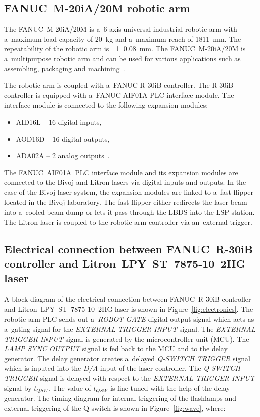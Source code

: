 \subsection{FANUC~M-20iA/20M robotic arm}

The FANUC~M-20iA/20M is a~6-axis universal industrial robotic arm with a~maximum load capacity of \SI{20}{\kg} and a~maximum reach of \SI{1811}{\mm}. The repeatability of the robotic arm is \SI{+-0.08}{\mm}. The FANUC~M-20iA/20M is a~multipurpose robotic arm and can be used for various applications such as assembling, packaging and machining~\cite{fanucrobot}.

The robotic arm is coupled with a~FANUC R-30iB controller. The R-30iB controller is equipped with a~FANUC AIF01A PLC interface module. The interface module is connected to the following expansion modules:

\begin{itemize}
    \item AID16L -- 16 digital inputs,
    \item AOD16D -- 16 digital outputs,
    \item ADA02A -- 2 analog outputs~\cite{fanucunitmanual}.
\end{itemize}

The FANUC~AIF01A~PLC interface module and its expansion modules are connected to the Bivoj and Litron lasers via digital inputs and outputs. In the case of the Bivoj laser system, the expansion modules are linked to a~fast flipper located in the Bivoj laboratory. The fast flipper either redirects the laser beam into a~cooled beam dump or lets it pass through the LBDS into the LSP station. The Litron laser is coupled to the robotic arm controller via an~external trigger. 

\subsection[Electrical connection between controller and laser]{Electrical connection between FANUC~R-30iB controller and Litron~LPY~ST~7875-10~2HG laser}
 \label{sec:electrical_connection}

A block diagram of the electrical connection between FANUC~R-30iB controller and Litron~LPY~ST~7875-10~2HG laser is shown in Figure~\ref{fig:electronics}. The robotic arm PLC sends out a~\textit{ROBOT GATE} digital output signal which acts as a~gating signal for the \textit{EXTERNAL TRIGGER INPUT} signal. The \textit{EXTERNAL TRIGGER INPUT} signal is generated by the microcontroller unit (MCU). The \textit{LAMP SYNC OUTPUT} signal is fed back to the MCU and to the delay generator. The delay generator creates a~delayed \textit{Q-SWITCH TRIGGER} signal which is inputed into the \textit{D/A}  input of the laser controller. The \textit{Q-SWITCH TRIGGER} signal is delayed with respect to the \textit{EXTERNAL TRIGGER INPUT} signal by $t_{QSW}$. The value of $t_{QSW}$ is fine-tuned with the help of the delay generator.  The timing diagram for internal triggering of the flashlamps and external triggering of the Q-switch is shown in Figure~\ref{fig:wave}, where:

